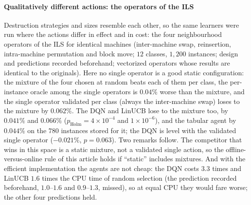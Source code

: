 

\paragraph{Qualitatively different actions: the operators of the ILS}
Destruction strategies and sizes resemble each other, so the same learners were run where the actions differ in effect and in cost: the four neighbourhood operators of the ILS for identical machines (inter-machine swap, reinsertion, intra-machine permutation and block move; $12$ classes, $1{,}200$ instances; design and predictions recorded beforehand; vectorized operators whose results are identical to the originals).
Here no single operator is a good static configuration: the mixture of the four chosen at random beats each of them per class, the per-instance oracle among the single operators is $0.04\%$ worse than the mixture, and the single operator validated per class (always the inter-machine swap) loses to the mixture by $0.062\%$. The DQN and LinUCB lose to the mixture too, by $0.041\%$ and $0.066\%$ ($p_{\mathrm{Holm}}=4\times10^{-4}$ and $1\times10^{-6}$),
and the tabular agent by $0.044\%$ on the $780$ instances stored for it; the DQN is level with the validated single operator ($-0.021\%$, $p=0.063$). Two remarks follow. The competitor that wins in this space is a static mixture, not a validated single action, so the offline-versus-online rule of this article holds if ``static'' includes mixtures. And with the efficient implementation the agents are not cheap:
the DQN costs $3.3$ times and LinUCB $1.6$ times the CPU time of random selection (the prediction recorded beforehand, $1.0$--$1.6$ and $0.9$--$1.3$, missed), so at equal CPU they would fare worse; the other four predictions held.

